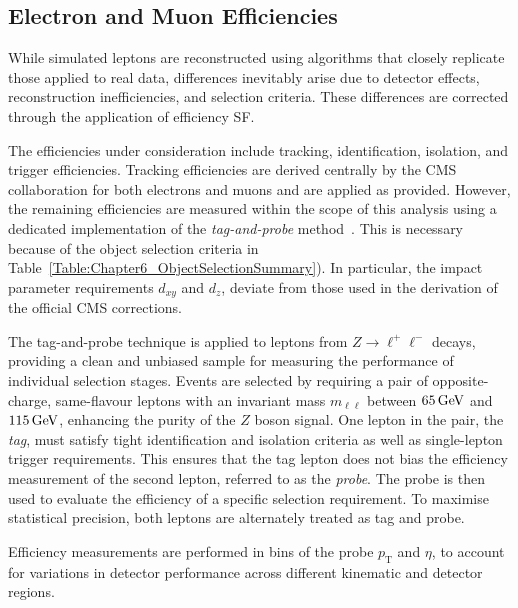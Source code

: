 \subsection{Electron and Muon Efficiencies}

While simulated leptons are reconstructed using algorithms that closely replicate those applied to real data, differences inevitably arise due to detector effects, reconstruction inefficiencies, and selection criteria. These differences are corrected through the application of efficiency \ac{SF}.

The efficiencies under consideration include tracking, identification, isolation, and trigger efficiencies. Tracking efficiencies are derived centrally by the CMS collaboration for both electrons and muons and are applied as provided. However, the remaining efficiencies are measured within the scope of this analysis using a dedicated implementation of the \textit{tag-and-probe} method~\cite{CMS_Muon_System_Performance,CMS_Muon_System_Performance_2}. This is necessary because of the object selection criteria in Table~\ref{Table:Chapter6_ObjectSelectionSummary}). In particular, the impact parameter requirements $d_{xy}$ and $d_z$, deviate from those used in the derivation of the official CMS corrections. 

The tag-and-probe technique is applied to leptons from $Z \rightarrow \ell^+\ell^-$ decays, providing a clean and unbiased sample for measuring the performance of individual selection stages. Events are selected by requiring a pair of opposite-charge, same-flavour leptons with an invariant mass $m_{\ell\ell}$ between $65\,\text{Ge\hspace{-.08em}V}$ and $115\,\text{Ge\hspace{-.08em}V}$, enhancing the purity of the $Z$ boson signal. One lepton in the pair, the \textit{tag}, must satisfy tight identification and isolation criteria as well as single-lepton trigger requirements. This ensures that the tag lepton does not bias the efficiency measurement of the second lepton, referred to as the \textit{probe}. The probe is then used to evaluate the efficiency of a specific selection requirement. To maximise statistical precision, both leptons are alternately treated as tag and probe. 

Efficiency measurements are performed in bins of the probe $p_{\mathrm{T}}$ and $\eta$, to account for variations in detector performance across different kinematic and detector regions. 

